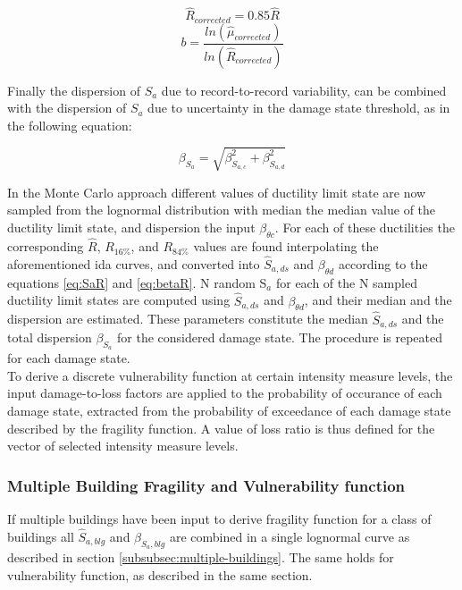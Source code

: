 \begin{equation}
\hat{R}_{corrected}=0.85\hat{R}
\label{eq:Rcorrected}
\end{equation}
\begin{equation}
b = \frac{ln(\hat{\mu}_{corrected})}{ln(\hat{R}_{corrected})}
\label{eq:bcorrected_DF}
\end{equation}

Finally the dispersion of $S_a$ due to record-to-record variability, can be combined with the dispersion of $S_a$ due to uncertainty in the damage state threshold, as in the following equation:

\begin{equation}
\beta_{S_a} = \sqrt{\beta_{S_{a, c}}^2+\beta_{S_{a, d}}^2}
\label{eq:betatot_DF}
\end{equation}

In the Monte Carlo approach different values of ductility limit state are now sampled from the lognormal distribution with median the median value of the ductility limit state, and dispersion the input $\beta_{\theta c}$. For each of these ductilities the corresponding $\hat{R}$, $R_{16\%}$, and $R_{84\%}$ values are found interpolating the aforementioned ida curves, and converted into $\hat{S}_{a,ds}$ and $\beta_{\theta d}$ according to the equations \ref{eq:SaR} and \ref{eq:betaR}.
N random S$_a$ for each of the N sampled ductility limit states are computed using $\hat{S}_{a,ds}$ and $\beta_{\theta d}$, and their median and the dispersion are estimated. These parameters constitute the median $\hat{S}_{a,ds}$ and the total dispersion $\beta_{S_a}$ for the considered damage state. The procedure is repeated for each damage state.\\

To derive a discrete vulnerability function at certain intensity measure levels, the input damage-to-loss factors are applied to the probability of occurance of each damage state, extracted from the probability of exceedance of each damage state described by the fragility function. A value of loss ratio is thus defined for the vector of selected intensity measure levels.

\subsubsection{Multiple Building Fragility and Vulnerability function}
\label{subsubsec:multiple-building-DF}
 If multiple buildings have been input to derive fragility function for a class of buildings all $\hat{S}_{a, blg}$ and $\beta_{S_a, blg}$ are combined in a single lognormal curve as described in section \ref{subsubsec:multiple-buildings}. The same holds for vulnerability function, as described in the same section.

